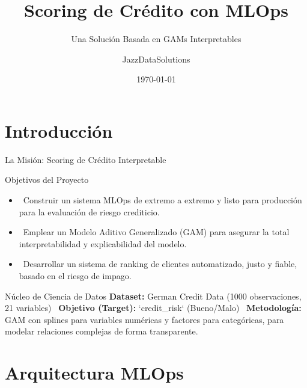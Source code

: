 \documentclass{beamer}
\title{Scoring de Crédito con MLOps}
\subtitle{Una Solución Basada en GAMs Interpretables}
\author{JazzDataSolutions}
\institute{Reto Técnico Finvero}
\date{\today}
\begin{document}
\section{Introducción}

\begin{frame}
  \titlepage
\end{frame}

\begin{frame}{La Misión: Scoring de Crédito Interpretable}
  \begin{block}{Objetivos del Proyecto}
    \begin{itemize}
      \item \faRocket\ Construir un sistema MLOps de extremo a extremo y listo para producción para la evaluación de riesgo crediticio.
      \item \faChartLine\ Emplear un Modelo Aditivo Generalizado (GAM) para asegurar la total interpretabilidad y explicabilidad del modelo.
      \item \faUsers\ Desarrollar un sistema de ranking de clientes automatizado, justo y fiable, basado en el riesgo de impago.
    \end{itemize}
  \end{block}
  \begin{block}{Núcleo de Ciencia de Datos}
    \textbf{Dataset:} German Credit Data (1000 observaciones, 21 variables) \ 
    \textbf{Objetivo (Target):} `credit_risk` (Bueno/Malo) \ 
    \textbf{Metodología:} GAM con splines para variables numéricas y factores para categóricas, para modelar relaciones complejas de forma transparente.
  \end{block}
\end{frame}

\section{Arquitectura MLOps}
\end{document}
